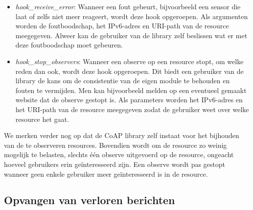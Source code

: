 \begin{itemize}
\begin{itemize}
\item \textit{hook\_receive\_error}: Wanneer een fout gebeurt, bijvoorbeeld een sensor die laat of zelfs niet meer reageert, wordt deze hook opgeroepen. Als argumenten worden de foutboodschap, het IPv6-adres en URI-path van de resource meegegeven. Alweer kan de gebruiker van de library zelf beslissen wat er met deze foutboodschap moet gebeuren.
\item \textit{hook\_stop\_observers}: Wanneer een observe op een resource stopt, om welke reden dan ook, wordt deze hook opgeroepen. Dit biedt een gebruiker van de library de kans om de consistentie van de eigen module te behouden en fouten te vermijden. Men kan bijvoorbeeld melden op een eventueel gemaakt website dat de observe gestopt is. Als parameters worden het IPv6-adres en het URI-path van de resource meegegeven zodat de gebruiker weet over welke resource het gaat.
\end{itemize}
\end{itemize}

We merken verder nog op dat de CoAP library zelf instaat voor het bijhouden van de te observeren resources. Bovendien wordt om de resource zo weinig mogelijk te belasten, slechts \'{e}\'{e}n observe uitgevoerd op de resource, ongeacht hoeveel gebruikers erin ge\"{i}nteresseerd zijn. Een observe wordt pas gestopt wanneer geen enkele gebruiker meer ge\"{i}nteresseerd is in de resource.


\subsection{Opvangen van verloren berichten}

